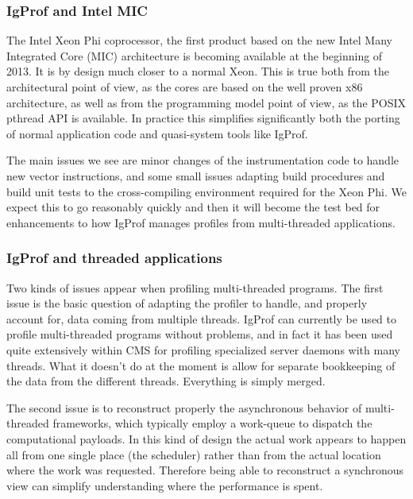 \documentclass[notitlepage,letter,12pt]{article}
\begin{document}
\subsubsection{IgProf and Intel MIC}

The Intel Xeon Phi coprocessor, the first product based on the new Intel Many 
Integrated Core (MIC) architecture is becoming available at the beginning
of 2013. It is by design much closer to a normal Xeon. This is true
both from the architectural point of view, as the cores are based on the 
well proven x86 architecture, as well as from the programming model point 
of view, as the POSIX pthread API is available. In practice this simplifies
significantly both the porting of normal application code and quasi-system 
tools like IgProf.

The main issues we see are minor changes of the instrumentation code to
handle new vector instructions, and some small issues adapting build
procedures and build unit tests to the cross-compiling environment
required for the Xeon Phi. We expect this to go reasonably quickly
and then it will become the test bed for enhancements to how IgProf
manages profiles from multi-threaded applications. 

\subsubsection{IgProf and threaded applications}

Two kinds of issues appear when profiling multi-threaded programs. The 
first issue is the basic question of adapting the profiler to handle, 
and properly account for, data coming from multiple threads. IgProf can 
currently be used to profile multi-threaded programs without
problems, and in fact it has been used quite extensively within CMS
for profiling specialized server daemons with many threads. What 
it doesn't do at the moment is allow for separate bookkeeping of the
data from the different threads. Everything is simply merged.

The second issue is to reconstruct properly the asynchronous behavior of 
multi-threaded frameworks, which typically employ a work-queue to dispatch the
computational payloads. In this kind of design the actual work appears
to happen all from one single place (the scheduler) rather than from
the actual location where the work was requested. Therefore being able to 
reconstruct a synchronous view can simplify understanding where the
performance is spent.
\end{document}

